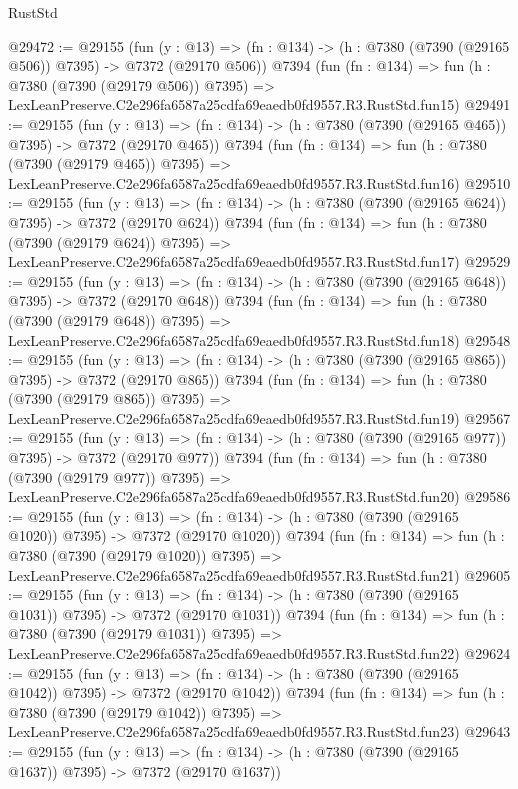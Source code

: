 \begin{lexlean}{RustStd}
\begin{coremodule}
@29472 := @29155
    (fun (y : @13) => (fn : @134) -> (h : @7380 (@7390 (@29165 @506)) @7395) -> @7372 (@29170 @506))
    @7394
    (fun (fn : @134) =>
    fun (h : @7380 (@7390 (@29179 @506)) @7395) =>
    LexLeanPreserve.C2e296fa6587a25cdfa69eaedb0fd9557.R3.RustStd.fun15)
@29491 := @29155
    (fun (y : @13) => (fn : @134) -> (h : @7380 (@7390 (@29165 @465)) @7395) -> @7372 (@29170 @465))
    @7394
    (fun (fn : @134) =>
    fun (h : @7380 (@7390 (@29179 @465)) @7395) =>
    LexLeanPreserve.C2e296fa6587a25cdfa69eaedb0fd9557.R3.RustStd.fun16)
@29510 := @29155
    (fun (y : @13) => (fn : @134) -> (h : @7380 (@7390 (@29165 @624)) @7395) -> @7372 (@29170 @624))
    @7394
    (fun (fn : @134) =>
    fun (h : @7380 (@7390 (@29179 @624)) @7395) =>
    LexLeanPreserve.C2e296fa6587a25cdfa69eaedb0fd9557.R3.RustStd.fun17)
@29529 := @29155
    (fun (y : @13) => (fn : @134) -> (h : @7380 (@7390 (@29165 @648)) @7395) -> @7372 (@29170 @648))
    @7394
    (fun (fn : @134) =>
    fun (h : @7380 (@7390 (@29179 @648)) @7395) =>
    LexLeanPreserve.C2e296fa6587a25cdfa69eaedb0fd9557.R3.RustStd.fun18)
@29548 := @29155
    (fun (y : @13) => (fn : @134) -> (h : @7380 (@7390 (@29165 @865)) @7395) -> @7372 (@29170 @865))
    @7394
    (fun (fn : @134) =>
    fun (h : @7380 (@7390 (@29179 @865)) @7395) =>
    LexLeanPreserve.C2e296fa6587a25cdfa69eaedb0fd9557.R3.RustStd.fun19)
@29567 := @29155
    (fun (y : @13) => (fn : @134) -> (h : @7380 (@7390 (@29165 @977)) @7395) -> @7372 (@29170 @977))
    @7394
    (fun (fn : @134) =>
    fun (h : @7380 (@7390 (@29179 @977)) @7395) =>
    LexLeanPreserve.C2e296fa6587a25cdfa69eaedb0fd9557.R3.RustStd.fun20)
@29586 := @29155
    (fun (y : @13) =>
    (fn : @134) -> (h : @7380 (@7390 (@29165 @1020)) @7395) -> @7372 (@29170 @1020))
    @7394
    (fun (fn : @134) =>
    fun (h : @7380 (@7390 (@29179 @1020)) @7395) =>
    LexLeanPreserve.C2e296fa6587a25cdfa69eaedb0fd9557.R3.RustStd.fun21)
@29605 := @29155
    (fun (y : @13) =>
    (fn : @134) -> (h : @7380 (@7390 (@29165 @1031)) @7395) -> @7372 (@29170 @1031))
    @7394
    (fun (fn : @134) =>
    fun (h : @7380 (@7390 (@29179 @1031)) @7395) =>
    LexLeanPreserve.C2e296fa6587a25cdfa69eaedb0fd9557.R3.RustStd.fun22)
@29624 := @29155
    (fun (y : @13) =>
    (fn : @134) -> (h : @7380 (@7390 (@29165 @1042)) @7395) -> @7372 (@29170 @1042))
    @7394
    (fun (fn : @134) =>
    fun (h : @7380 (@7390 (@29179 @1042)) @7395) =>
    LexLeanPreserve.C2e296fa6587a25cdfa69eaedb0fd9557.R3.RustStd.fun23)
@29643 := @29155
    (fun (y : @13) =>
    (fn : @134) -> (h : @7380 (@7390 (@29165 @1637)) @7395) -> @7372 (@29170 @1637))

\end{coremodule}
\end{lexlean}
